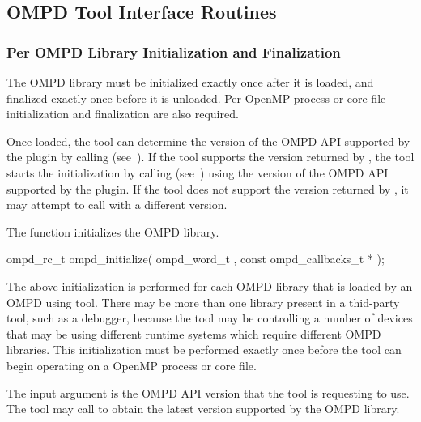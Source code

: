 
\subsection{OMPD Tool Interface Routines}
\label{subsec:ompd-api}

\subsubsection{Per OMPD Library Initialization and Finalization}

The OMPD library must be initialized exactly once after it is loaded, and finalized exactly once
before it is unloaded. Per OpenMP process or core file initialization and finalization are also required.

Once loaded, the tool can determine the version of the OMPD API supported by the
plugin by calling  (see~). If the tool supports the version returned by ,
the tool starts the initialization by calling  (see~) using the version
of the OMPD API supported by the plugin.  If the tool does not support the version returned by , it may attempt to call  with
a different version.


\label{subsubsubsec:ompd_initialize}

\summary
The  function initializes the OMPD library.

\format

\begin{cspecific}
\begin{ompSyntax}
ompd_rc_t ompd_initialize(
  ompd_word_t ,
  const ompd_callbacks_t *
);
\end{ompSyntax}
\end{cspecific}

\descr
The above initialization is performed for each OMPD library that is loaded by an OMPD using tool.
There may be more than one library present in a thid-party tool, such as a debugger, because the tool
may be controlling a number of devices that may be using different runtime systems which require
different OMPD libraries. This initialization must be performed exactly once before the tool
can begin operating on a OpenMP process or core file.

\argdesc
The  input argument is the OMPD API version that the tool is requesting to use.
The tool may call  to obtain the latest version supported by the OMPD library.

